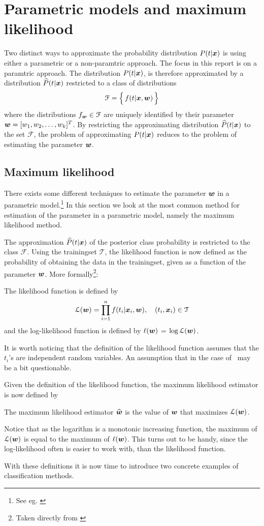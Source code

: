 \section{Parametric models and maximum likelihood}\label{sec:parametric-models-and-likelihood}
Two distinct ways to approximate the probability distribution $P(t|\boldsymbol{x})$ is using either a parametric or a non-paramtric approach. The focus in this report is on a paramtric approach. The distribution $P(t|\boldsymbol{x})$, is therefore approximated by a distribution $\widehat{P}(t|\boldsymbol{x})$ restricted to a class of distributions
\[
    \mathcal{F} = \Bigl\{\,f(t|\boldsymbol{x},\boldsymbol{w})\,\Bigr\}
\]
where the distributions $f_{\boldsymbol{w}}\in\mathcal{F}$ are uniquely identified by their parameter $\boldsymbol{w}=[w_1, w_2, \dots, w_k]^T$. By restricting the approximating distribution $\widehat{P}(t|\boldsymbol{x})$ to the set $\mathcal{F}$, the problem of approximating $P(t|\boldsymbol{x})$ reduces to the problem of estimating the parameter $\boldsymbol{w}$.

\subsection{Maximum likelihood}
There exists some different techniques to estimate the parameter $\boldsymbol{w}$ in a parametric model.\footnote{See eg. \citet[Sec.9]{wasserman04}} In this section we look at the most common method for estimation of the parameter in a parametric model, namely the maximum likelihood method.\par
The approximation $\widehat{P}(t|\boldsymbol{x})$ of the posterior class probability is restricted to the class $\mathcal{F}$. Using the trainingset $\mathcal{T}$, the likelihood function is now defined as the probability of obtaining the data in the trainingset, given as a function of the parameter $\boldsymbol{w}$. More formally\footnote{Taken directly from \citet[p.122]{wasserman04}}:
\begin{definition}
    The likelihood function is defined by
    \[
    \mathcal{L}(\boldsymbol{w}) = \prod_{i=1}^n f(t_i|\boldsymbol{x}_i,\boldsymbol{w}),\quad (t_i,\boldsymbol{x}_i)\in\mathcal{T}
    \]
    and the log-likelihood function is defined by $\ell(\boldsymbol{w})$ = $\log\mathcal{L(\boldsymbol{w})}$.
\end{definition}
It is worth noticing that the definition of the likelihood function assumes that the $t_i$'s are independent random variables. An assumption that in the case of \TFC\ may be a bit questionable. \par
Given the definition of the likelihood function, the maximum likelihood estimator is now defined by
\begin{definition}
    The maximum likelihood estimator $\widehat{\boldsymbol{w}}$ is the value of $\boldsymbol{w}$ that maximizes $\mathcal{L}(\boldsymbol{w})$.
\end{definition}
Notice that as the logarithm is a monotonic increasing function, the maximum of $\mathcal{L}(\boldsymbol{w})$ is equal to the maximum of $\ell(\boldsymbol{w})$. This turns out to be handy, since the log-likelihood often is easier to work with, than the likelihood function. \par
With these definitions it is now time to introduce two concrete examples of classification methods.



